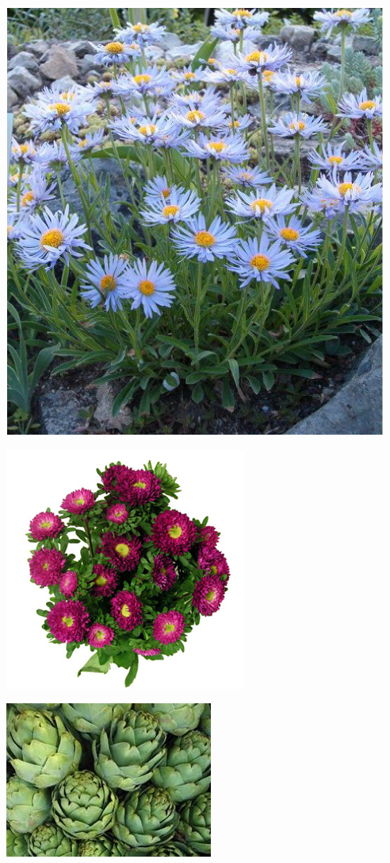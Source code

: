 \documentclass{article}
\begin{document}
\vspace{-0.5cm}
\begin{center}
\includegraphics[height=0.9\textheight, angle=90]{../Aster_alpinus.jpg}
\end{center}
\newpage

\begin{center}
\includegraphics[height=0.9\textheight, angle=90]{../Aster_Bouquet.jpg}
\end{center}
\newpage

\begin{center}
\includegraphics[height=0.9\textheight, angle=90]{../Atrichoke.jpg}
\end{center}
\newpage
\end{document}
